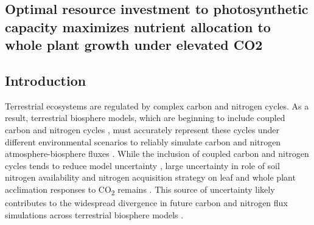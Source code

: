 \begin{singlespace}
    \chapter{\textbf{Optimal resource investment to photosynthetic capacity maximizes nutrient allocation to whole plant growth under elevated CO2}}
\end{singlespace}
    
\section{Introduction}
Terrestrial ecosystems are regulated by complex carbon and nitrogen cycles. As a result, terrestrial biosphere models, which are beginning to include coupled carbon and nitrogen cycles , must accurately represent these cycles under different environmental scenarios to reliably simulate carbon and nitrogen atmosphere-biosphere fluxes . While the inclusion of coupled carbon and nitrogen cycles tends to reduce model uncertainty , large uncertainty in role of soil nitrogen availability and nitrogen acquisition strategy on leaf and whole plant acclimation responses to CO\textsubscript{2} remains . This source of uncertainty likely contributes to the widespread divergence in future carbon and nitrogen flux simulations across terrestrial biosphere models .

